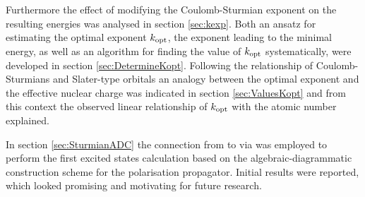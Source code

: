 Furthermore the effect of modifying the Coulomb-Sturmian
exponent on the resulting \HF energies was analysed in section \ref{sec:kexp}.
Both an ansatz for estimating the optimal exponent $k_\text{opt}$,
\ie the exponent leading to the minimal energy,
as well as
an algorithm for finding the value of $k_\text{opt}$ systematically,
were developed in section \ref{sec:DetermineKopt}.
Following the relationship of Coulomb-Sturmians and Slater-type orbitals
an analogy between the optimal exponent and
the effective nuclear charge was indicated in section \ref{sec:ValuesKopt}
and from this context the observed
linear relationship of $k_\text{opt}$ with the atomic number explained.

In section \ref{sec:SturmianADC} the connection from
\molsturm to \adcman via \python
was employed to perform the first
excited states calculation based on the algebraic-diagrammatic construction
scheme for the polarisation propagator.
Initial results were reported,
which looked promising and motivating for future research.

